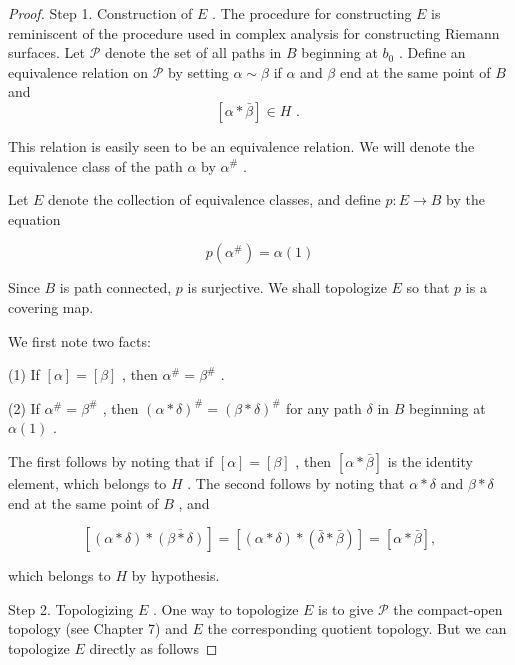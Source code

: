 \begin{proof}Step 1. Construction of \(E\) . The procedure for constructing \(E\) is reminiscent of the procedure used in complex analysis for constructing Riemann surfaces. Let \(\mathcal{P}\) denote the set of all paths in \(B\) beginning at \({b}_{0}\) . Define an equivalence relation on \(\mathcal{P}\) by setting \(\alpha  \sim  \beta\) if \(\alpha\) and \(\beta\) end at the same point of \(B\) and
\[
\left\lbrack  {\alpha  * \bar{\beta }}\right\rbrack \in  H\text{ . }
\]

This relation is easily seen to be an equivalence relation. We will denote the equivalence class of the path \(\alpha\) by \({\alpha }^{\# }\) .

Let \(E\) denote the collection of equivalence classes, and define \(p : E \rightarrow  B\) by the equation

\[
p\left( {\alpha }^{\# }\right)  = \alpha \left( 1\right)
\]

Since \(B\) is path connected, \(p\) is surjective. We shall topologize \(E\) so that \(p\) is a covering map.

We first note two facts:

(1) If \(\left\lbrack  \alpha \right\rbrack = \left\lbrack  \beta \right\rbrack\) , then \({\alpha }^{\# } = {\beta }^{\# }\) .

(2) If \({\alpha }^{\# } = {\beta }^{\# }\) , then \({\left( \alpha  * \delta \right) }^{\# } = {\left( \beta  * \delta \right) }^{\# }\) for any path \(\delta\) in \(B\) beginning at \(\alpha \left( 1\right)\) .

The first follows by noting that if \(\left\lbrack  \alpha \right\rbrack = \left\lbrack  \beta \right\rbrack\) , then \(\left\lbrack  {\alpha  * \bar{\beta }}\right\rbrack\) is the identity element, which belongs to \(H\) . The second follows by noting that \(\alpha  * \delta\) and \(\beta  * \delta\) end at the same point of \(B\) , and

\[
\left\lbrack  {\left( {\alpha  * \delta }\right)  * \overline{\left( \beta  * \delta \right) }}\right\rbrack = \left\lbrack  {\left( {\alpha  * \delta }\right)  * \left( {\bar{\delta } * \bar{\beta }}\right) }\right\rbrack = \left\lbrack  {\alpha  * \bar{\beta }}\right\rbrack  ,
\]

which belongs to \(H\) by hypothesis.

Step 2. Topologizing \(E\) . One way to topologize \(E\) is to give \(\mathcal{P}\) the compact-open topology (see Chapter 7) and \(E\) the corresponding quotient topology. But we can topologize \(E\) directly as follows


\end{proof}

